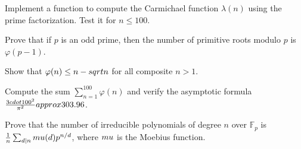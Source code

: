 \begin{exercise}[Computational]
Implement a function to compute the Carmichael function $\lambda(n)$ using the prime factorization. Test it for $n \leq 100$.
\end{exercise}

\begin{exercise}
Prove that if $p$ is an odd prime, then the number of primitive roots modulo $p$ is $\varphi(p-1)$.
\end{exercise}

\begin{exercise}
Show that $\varphi(n) \leq n - \\sqrt{n}$ for all composite $n > 1$.
\end{exercise}

\begin{exercise}
Compute the sum $\sum_{n=1}^{100} \varphi(n)$ and verify the asymptotic formula $\frac{3 \\cdot 100^2}{\pi^2} \\approx 303.96$.
\end{exercise}

\begin{exercise}
Prove that the number of irreducible polynomials of degree $n$ over $\mathbb{F}_p$ is $\frac{1}{n} \sum_{d|n} \\mu(d) p^{n/d}$, where $\\mu$ is the Moebius function.
\end{exercise}

